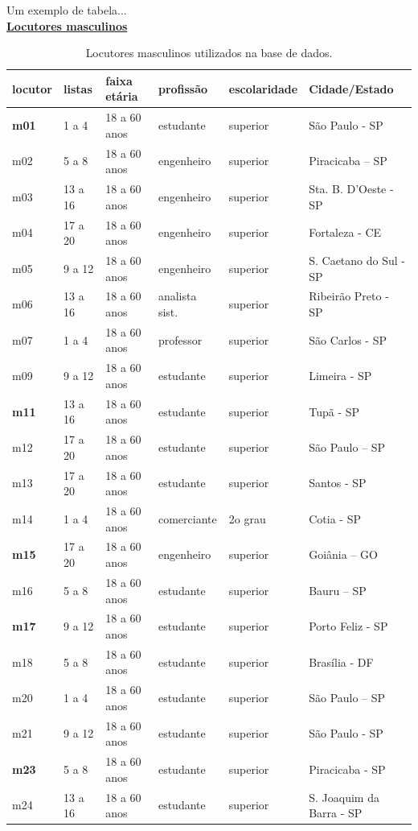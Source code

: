 Um exemplo de tabela...\\

\underline{\textbf{Locutores masculinos}}
\begin{table}[htbp]
\centering 
\scalebox{0.7} {
	\begin{tabular}{ l | l | l | l | l | l }
	locutor&listas&faixa etária&profissão&escolaridade&Cidade/Estado\\ \hline
	\textbf{m01}&1 a 4&18 a 60 anos&estudante&superior&São Paulo - SP \\
	m02&5 a 8&18 a 60 anos&engenheiro&superior&Piracicaba – SP\\
	m03&13 a 16&18 a 60 anos&engenheiro&superior&Sta. B. D’Oeste - SP\\
	m04&17 a 20&18 a 60 anos&engenheiro&superior&Fortaleza - CE\\
	m05&9 a 12&18 a 60 anos&engenheiro&superior&S. Caetano do Sul - SP\\
	m06&13 a 16&18 a 60 anos&analista sist.&superior&Ribeirão Preto - SP\\
	m07&1 a 4&18 a 60 anos&professor&superior&São Carlos - SP\\
	m09&9 a 12&18 a 60 anos&estudante&superior&Limeira - SP\\
	\textbf{m11}&13 a 16&18 a 60 anos&estudante&superior&Tupã - SP\\
	m12&17 a 20&18 a 60 anos&estudante&superior&São Paulo – SP\\
	m13&17 a 20&18 a 60 anos&estudante&superior&Santos - SP\\
	m14&1 a 4&18 a 60 anos&comerciante&2o grau&Cotia - SP\\
	\textbf{m15}&17 a 20&18 a 60 anos&engenheiro&superior&Goiânia – GO\\
	m16&5 a 8&18 a 60 anos&estudante&superior&Bauru – SP\\
	\textbf{m17}&9 a 12&18 a 60 anos&estudante&superior&Porto Feliz - SP\\
	m18&5 a 8&18 a 60 anos&estudante&superior&Brasília - DF\\
	m20&1 a 4&18 a 60 anos&estudante&superior&São Paulo – SP\\
	m21&9 a 12&18 a 60 anos&estudante&superior&São Paulo - SP\\
	\textbf{m23}&5 a 8&18 a 60 anos&estudante&superior&Piracicaba - SP\\
	m24&13 a 16&18 a 60 anos&estudante&superior&S. Joaquim da Barra - SP\\
	\end{tabular}
}
\caption{Locutores masculinos utilizados na base de dados.}
\label{tab:locutoresmasculinos}
\end{table}


